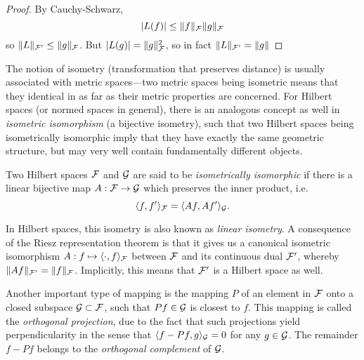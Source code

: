 \begin{proof}
  By Cauchy-Schwarz,
  \[
    |L(f)| \leq \lVert f\rVert_{\mathcal F}\lVert g\rVert_{\mathcal F}
  \]
  so $\lVert L\rVert_{{\mathcal F}'}\leq \lVert g\rVert_{\mathcal F}$.
  But  $|L(g)| = \lVert g\rVert_{\mathcal F}^2$, so in fact $\lVert L\rVert_{{\mathcal F}'} = \lVert g\rVert$
\end{proof}

The notion of isometry (transformation that preserves distance) is usually associated with metric spaces---two metric spaces being isometric means that they identical in as far as their metric properties are concerned.
For Hilbert spaces (or normed spaces in general), there is an analogous concept as well in \emph{isometric isomorphism} (a bijective isometry), such that two Hilbert spaces being isometrically isomorphic imply that they have exactly the same geometric structure, but may very well contain fundamentally different objects.

\begin{definition}
  Two Hilbert spaces ${\mathcal F}$ and ${\mathcal G}$ are said to be \emph{isometrically isomorphic} if there is a linear bijective map $A:{\mathcal F}\to{\mathcal G}$ which preserves the inner product, i.e. 
  \[
    \langle f,f'\rangle_{\mathcal F} = \langle Af,Af'\rangle_{\mathcal G}.
  \]
\end{definition}

In Hilbert spaces, this isometry is also known as \emph{linear isometry}.
A consequence of the Riesz representation theorem is that it gives us a canonical isometric isomorphism $A:f\mapsto \langle\cdot,f\rangle_{\mathcal F}$ between ${\mathcal F}$ and its continuous dual ${\mathcal F}'$, whereby $\lVert Af\rVert_{{\mathcal F}'} = \lVert f\rVert_{\mathcal F}$.
Implicitly, this means that ${\mathcal F}'$ is a Hilbert space as well.

Another important type of mapping is the mapping $P$ of an element in ${\mathcal F}$ onto a closed subspace ${\mathcal G}\subset{\mathcal F}$, such that $Pf \in {\mathcal G}$ is closest to $f$.
This mapping is called the \emph{orthogonal projection}, due to the fact that such projections yield perpendicularity in the sense that $\langle f-Pf,g\rangle_{\mathcal G} = 0$ for any $g\in{\mathcal G}$.
The remainder $f - Pf$ belongs to the \emph{orthogonal complement} of ${\mathcal G}$.

